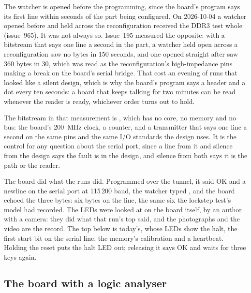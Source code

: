 \documentclass[journal,onecolumn,9pt]{IEEEtran}
\begin{document}
The watcher is opened before the programming, since the board's
program says its first line within seconds of the part being
configured. On 2026-10-04 a watcher opened before
 and held across the reconfiguration
received the DDR3 test whole (issue~965). It was not always so. Issue~195
measured the opposite: with a bitstream that says one line a second in
the part, a watcher held open across a reconfiguration saw no bytes in
150 seconds, and one opened straight after saw 360 bytes in 30, which
was read as the reconfiguration's high-impedance pins making a break on
the board's serial bridge. That cost an evening of runs that looked
like a silent design, which is why the board's program says a header
and a dot every ten seconds: a board that keeps talking for two minutes
can be read whenever the reader is ready, whichever order turns out to
hold.

The bitstream in that measurement is ,
which has no core, no memory and no bus: the board's 200~MHz clock, a
counter, and a transmitter that says one line a second on the same pins
and the same I/O standards the design uses. It is the control for any
question about the serial port, since a line from it and silence from
the design says the fault is in the design, and silence from both says
it is the path or the reader.

The board did what the runs did. Programmed over the tunnel, it said
OK and a newline on the serial port at 115\,200 baud, the watcher
typed , and the board echoed the three bytes: six bytes on
the line, the same six the lockstep test's model had recorded. The
LEDs were looked at on the board itself, by an author with a camera:
they did what that run's top said, and the photographs and the video
are the record. The top below is today's, whose LEDs show the halt,
the first start bit on the serial line, the memory's calibration and
a heartbeat. Holding the reset puts the halt LED out; releasing it says OK
and waits for three keys again.




\subsection{The board with a logic analyser}
\label{sec:v-ila}
\end{document}
